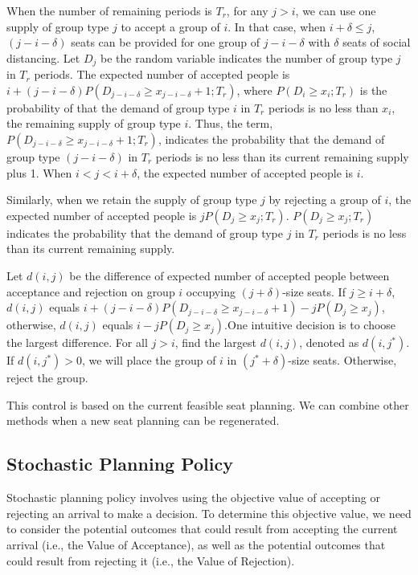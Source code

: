 When the number of remaining periods is $T_r$, for any $j>i$, we can use one supply of group type $j$ to accept a group of $i$. In that case, when $i+\delta \leq j$, $(j-i-\delta)$ seats can be provided for one group of $j-i-\delta$ with $\delta$ seats of social distancing. Let $D_j$ be the random variable indicates the number of group type $j$ in $T_r$ periods. The expected number of accepted people is $i + (j-i-\delta)P(D_{j-i-\delta} \geq x_{j-i-\delta}+1; T_r)$, where $P(D_i \geq x_i; T_r)$ is the probability of that the demand of group type $i$ in $T_r$ periods is no less than $x_i$, the remaining supply of group type $i$. Thus, the term, $P(D_{j-i-\delta} \geq x_{j-i-\delta}+1; T_r)$, indicates the probability that the demand of group type $(j-i-\delta)$ in $T_r$ periods is no less than its current remaining supply plus 1. When $i <j < i+\delta$, the expected number of accepted people is $i$.

Similarly, when we retain the supply of group type $j$ by rejecting a group of $i$, the expected number of accepted people is $j P(D_{j} \geq x_{j}; T_r)$. $P(D_{j} \geq x_{j}; T_r)$ indicates the probability that the demand of group type $j$ in $T_r$ periods is no less than its current remaining supply.

Let $d(i,j)$ be the difference of expected number of accepted people between acceptance and rejection on group $i$ occupying $(j+\delta)$-size seats. If $j \geq i+\delta$, $d(i,j)$ equals $i + (j-i-\delta)P(D_{j-i-\delta} \geq x_{j-i-\delta}+1) - j P(D_{j} \geq x_{j})$, otherwise, $d(i,j)$ equals $i - j P(D_{j} \geq x_{j})$.One intuitive decision is to choose the largest difference. For all $j >i$, find the largest $d(i,j)$, denoted as $d(i,j^{*})$. If $d(i,j^{*}) >0$, we will place the group of $i$ in $(j^{*}+\delta)$-size seats. Otherwise, reject the group.


\begin{remark}
  This control is based on the current feasible seat planning. We can combine other methods when a new seat planning can be regenerated.
\end{remark}

\subsection{Stochastic Planning Policy}
Stochastic planning policy involves using the objective value of accepting or rejecting an arrival to make a decision. To determine this objective value, we need to consider the potential outcomes that could result from accepting the current arrival (i.e., the Value of Acceptance), as well as the potential outcomes that could result from rejecting it (i.e., the Value of Rejection).

